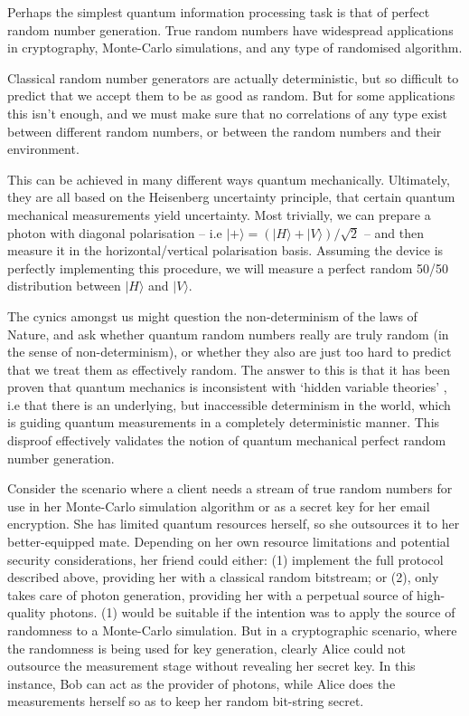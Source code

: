 \documentclass[aps,rmp,twocolumn,amsmath,amssymb,nofootinbib,superscriptaddress,longbibliography,floatfix]{revtex4-1}
\newcommand{\ket}[1]{|#1\rangle}
\begin{document}
Perhaps the simplest quantum information processing task is that of perfect random number generation. True random numbers have widespread applications in cryptography, Monte-Carlo simulations, and any type of randomised algorithm.

Classical random number generators are actually deterministic, but so difficult to predict that we accept them to be as good as random. But for some applications this isn't enough, and we must make sure that no correlations of any type exist between different random numbers, or between the random numbers and their environment.

This can be achieved in many different ways quantum mechanically. Ultimately, they are all based on the Heisenberg uncertainty principle, that certain quantum mechanical measurements yield uncertainty. Most trivially, we can prepare a photon with diagonal polarisation -- i.e \mbox{$\ket{+} = (\ket{H}+\ket{V})/\sqrt{2}$} -- and then measure it in the horizontal/vertical polarisation basis. Assuming the device is perfectly implementing this procedure, we will measure a perfect random 50/50 distribution between $\ket{H}$ and $\ket{V}$.

The cynics amongst us might question the non-determinism of the laws of Nature, and ask whether quantum random numbers really are truly random (in the sense of non-determinism), or whether they also are just too hard to predict that we treat them as effectively random. The answer to this is that it has been proven that quantum mechanics is inconsistent with `hidden variable theories' \cite{Bell}, i.e that there is an underlying, but inaccessible determinism in the world, which is guiding quantum measurements in a completely deterministic manner. This disproof effectively validates the notion of quantum mechanical perfect random number generation.

Consider the scenario where a client needs a stream of true random numbers for use in her Monte-Carlo simulation algorithm or as a secret key for her email encryption. She has limited quantum resources herself, so she outsources it to her better-equipped mate. Depending on her own resource limitations and potential security considerations, her friend could either: (1) implement the full protocol described above, providing her with a classical random bitstream; or (2), only takes care of photon generation, providing her with a perpetual source of high-quality photons. (1) would be suitable if the intention was to apply the source of randomness to a Monte-Carlo simulation. But in a cryptographic scenario, where the randomness is being used for key generation, clearly Alice could not outsource the measurement stage without revealing her secret key. In this instance, Bob can act as the provider of photons, while Alice does the measurements herself so as to keep her random bit-string secret.
\end{document}

